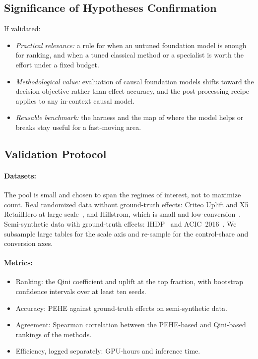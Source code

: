 \documentclass[twocolumn]{style}
\begin{document}
\subsection{Significance of Hypotheses Confirmation}
If validated:
\begin{itemize}
    \item \textit{Practical relevance:} a rule for when an untuned foundation model is enough for
    ranking, and when a tuned classical method or a specialist is worth the effort under a fixed
    budget.
    \item \textit{Methodological value:} evaluation of causal foundation models shifts toward the
    decision objective rather than effect accuracy, and the post-processing recipe applies to any
    in-context causal model.
    \item \textit{Reusable benchmark:} the harness and the map of where the model helps or breaks
    stay useful for a fast-moving area.
\end{itemize}

\subsection{Validation Protocol}
\paragraph{Datasets:} The pool is small and chosen to span the regimes of interest, not to maximize
count. Real randomized data without ground-truth effects: Criteo Uplift and X5 RetailHero at large
scale~\cite{diemert2018criteo}, and Hillstrom, which is small and low-conversion~\cite{hillstrom2008}.
Semi-synthetic data with ground-truth effects: IHDP~\cite{hill2011ihdp} and ACIC~2016~\cite{dorie2019acic}.
We subsample large tables for the scale axis and re-sample for the control-share and conversion axes.

\paragraph{Metrics:}
\begin{itemize}
    \item Ranking: the Qini coefficient and uplift at the top fraction, with bootstrap confidence
    intervals over at least ten seeds.
    \item Accuracy: PEHE against ground-truth effects on semi-synthetic data.
    \item Agreement: Spearman correlation between the PEHE-based and Qini-based rankings of the
    methods.
    \item Efficiency, logged separately: GPU-hours and inference time.
\end{itemize}
\end{document}
